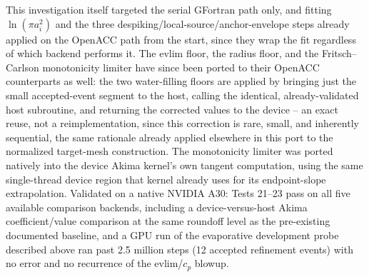 This investigation itself targeted the serial GFortran path only, and
fitting $\ln\left(\pi a_{i}^{2}\right)$ and the three
despiking/local-source/anchor-envelope steps already applied on the
OpenACC path from the start, since they wrap the fit regardless of which
backend performs it. The evlim floor, the radius floor, and the
Fritsch--Carlson monotonicity limiter have since been ported to their
OpenACC counterparts as well: the two water-filling floors are applied by
bringing just the small accepted-event segment to the host, calling the
identical, already-validated host subroutine, and returning the corrected
values to the device -- an exact reuse, not a reimplementation, since this
correction is rare, small, and inherently sequential, the same rationale
already applied elsewhere in this port to the normalized target-mesh
construction. The monotonicity limiter was ported natively into the
device Akima kernel's own tangent computation, using the same single-thread
device region that kernel already uses for its endpoint-slope
extrapolation. Validated on a native NVIDIA A30: Tests 21--23 pass on all
five available comparison backends, including a device-versus-host Akima
coefficient/value comparison at the same roundoff level as the
pre-existing documented baseline, and a GPU run of the evaporative
development probe described above ran past 2.5 million steps (12 accepted
refinement events) with no error and no recurrence of the evlim/$c_p$
blowup.
